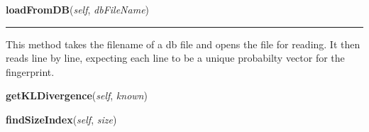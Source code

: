     \label{FingerprintAttackClasses:WebsiteFingerprint:loadFromDB}

    \vspace{0.5ex}

\hspace{.8\funcindent}\begin{boxedminipage}{\funcwidth}

    \raggedright \textbf{loadFromDB}(\textit{self}, \textit{dbFileName})

    \vspace{-1.5ex}

    \rule{\textwidth}{0.5\fboxrule}
\setlength{\parskip}{2ex}
    This method takes the filename of a db file and opens the file for 
    reading. It then reads line by line, expecting each line to be a unique
    probabilty vector for the fingerprint.

\setlength{\parskip}{1ex}
    \end{boxedminipage}

    \label{FingerprintAttackClasses:WebsiteFingerprint:getKLDivergence}

    \vspace{0.5ex}

\hspace{.8\funcindent}\begin{boxedminipage}{\funcwidth}

    \raggedright \textbf{getKLDivergence}(\textit{self}, \textit{known})

\setlength{\parskip}{2ex}
\setlength{\parskip}{1ex}
    \end{boxedminipage}

    \label{FingerprintAttackClasses:WebsiteFingerprint:findSizeIndex}

    \vspace{0.5ex}

\hspace{.8\funcindent}\begin{boxedminipage}{\funcwidth}

    \raggedright \textbf{findSizeIndex}(\textit{self}, \textit{size})

\setlength{\parskip}{2ex}
\setlength{\parskip}{1ex}
    \end{boxedminipage}

